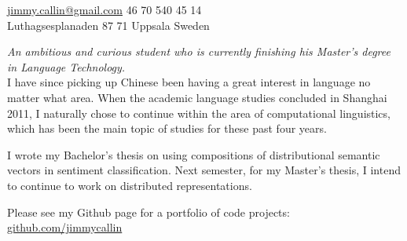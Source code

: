 \documentclass[10pt,a4paper]{article}
\begin{document}
\sloppy  %



\nobreakvspace{0.3em}  %

\noindent\href{mailto:jimmy.callin@gmail.com}{jimmy.callin@gmail.com}\sbull
\textsmaller{+}46 70 540 45 14
\\
Luthagsesplanaden 87 71\thinspace {\large}\sbull
Uppsala\sbull
Sweden

\spacedhrule{0.9em}{-0.4em}  %


\vspace{-1.3em}  %
\begin{multicols}{2}  %
\noindent \emph{An ambitious and curious student who is currently finishing his Master's degree in Language Technology.}
\\
I have since picking up Chinese been having a great interest in language no matter what area. When the academic language studies concluded in Shanghai 2011, I naturally chose to continue within the area of computational linguistics, which has been the main topic of studies for these past four years.

I wrote my Bachelor's thesis on using compositions of distributional semantic vectors in sentiment classification. Next semester, for my Master's thesis, I intend to continue to work on distributed representations.

Please see my Github page for a portfolio of code projects: \href{https://github.com/jimmycallin}{github.com/jimmycallin}
\end{multicols}


\spacedhrule{0em}{-0.4em}

\end{document}
